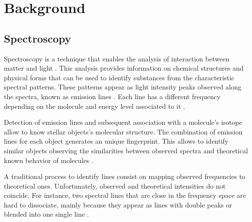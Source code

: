 \section{Background} \label{sec:background}

\subsection{Spectroscopy}
Spectroscopy is a technique that enables the analysis of interaction between matter and light \citep{smith_mr_sp_2005}.
This analysis provides information on chemical structures and physical forms that can be used to identify substances from the characteristic spectral patterns.
These patterns appear as light intensity peaks observed along the spectra, known as emission lines \citep{struve_fundamentals_1989}.
Each line has a different frequency depending on the molecule and energy level associated to it \citep{smith_mr_sp_2005}.

Detection of emission lines and subsequent association with a molecule's isotope allow to know stellar objects's molecular structure.
The combination of emission lines for each object generates an unique fingerprint.
This allows to identify similar objects observing the similarities between observed spectra and theoretical known behavior of molecules \citep{howley_effect_2005}.

A traditional process to identify lines consist on mapping observed frequencies to theoretical ones.
Unfortunately, observed and theoretical intensities do not coincide. For instance,
two spectral lines that are close in the frequency space are hard to dissociate, mainly because they appear
as lines with double peaks or blended into one single line \citep{cernicharo_detection_2013, smith_molecular_2015}.

